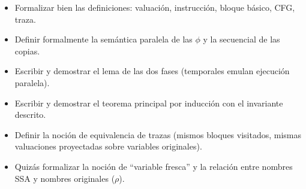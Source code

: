 \documentclass[12pt, a4paper]{article}
\begin{document}
\begin{itemize}
  \item Formalizar bien las definiciones: valuación, instrucción, bloque básico, CFG, traza.
  \item Definir formalmente la semántica paralela de las $\phi$ y la secuencial de las copias.
  \item Escribir y demostrar el lema de las dos fases (temporales emulan ejecución paralela).
  \item Escribir y demostrar el teorema principal por inducción con el invariante descrito.
  \item Definir la noción de equivalencia de trazas (mismos bloques visitados, mismas
    valuaciones proyectadas sobre variables originales).
  \item Quizás formalizar la noción de ``variable fresca'' y la relación entre nombres SSA
    y nombres originales ($\rho$).
\end{itemize}
\end{document}
